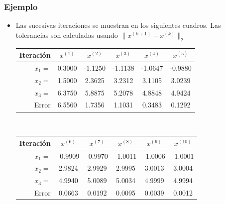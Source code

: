 \documentclass[10pt]{beamer}
\begin{document}
  \begin{frame}
    \frametitle{Ejemplo}
    \begin{itemize}
      \item<1-> Las sucesivas iteraciones se muestran en los siguientes cuadros. Las tolerancias son calculadas usando $\|x^{(k+1)}-x^{(k)}\|_2$
      \newline
      \begin{center}
        \begin{tabular}{rccccc}\hline
          Iteraci\'on & $x^{(1)}$ & $x^{(2)}$ & $x^{(3)}$ & $x^{(4)}$ & $x^{(5)}$\\\hline  
          $x_1 = $ & 0.3000 & -1.1250 & -1.1138 & -1.0647  & -0.9880\\
          $x_2 = $ & 1.5000 & 2.3625 & 3.2312 & 3.1105 & 3.0239\\
          $x_3 = $ & 6.3750 & 5.8875 & 5.2078 & 4.8848 & 4.9424\\
          Error & 6.5560 & 1.7356 & 1.1031 & 0.3483 & 0.1292
        \end{tabular}\\[10pt]
        \begin{tabular}{rccccc}\hline
          Iteraci\'on & $x^{(6)}$ & $x^{(7)}$ & $x^{(8)}$ & $x^{(9)}$ & $x^{(10)}$\\\hline  
          $x_1 = $ & -0.9909  & -0.9970 & -1.0011 &  -1.0006 & -1.0001\\
          $x_2 = $ & 2.9824 & 2.9929  & 2.9995 & 3.0013 & 3.0004\\
          $x_3 = $ & 4.9940 & 5.0089 & 5.0034 & 4.9999 & 4.9994\\
          Error & 0.0663 & 0.0192 & 0.0095 & 0.0039 & 0.0012
        \end{tabular}
      \end{center}
    \end{itemize}
  \end{frame}
\end{document}
